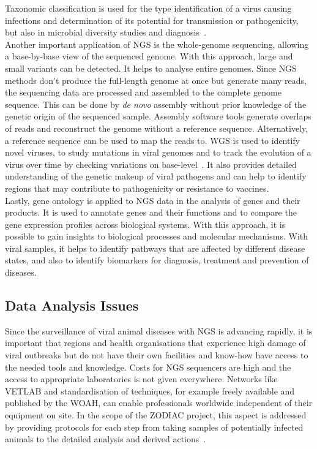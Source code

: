 Taxonomic classification is used for the type identification of a virus causing infections and determination of its potential for transmission or pathogenicity, but also in microbial diversity studies and diagnosis~\cite{dutilh2021perspective}. \\
Another important application of \ac{NGS} is the whole-genome sequencing, allowing a base-by-base view of the sequenced genome. With this approach, large and small variants can be detected. It helps to analyse entire genomes. Since \ac{NGS} methods don't produce the full-length genome at once but generate many reads, the sequencing data are processed and assembled to the complete genome sequence. This can be done by \textit{de novo} assembly without prior knowledge of the genetic origin of the sequenced sample. Assembly software tools generate overlaps of reads and reconstruct the genome without a reference sequence. Alternatively, a reference sequence can be used to map the reads to. \ac{WGS} is used to identify novel viruses, to study mutations in viral genomes and to track the evolution of a virus over time by checking variations on base-level~\cite{slatko2018overview}. It also provides detailed understanding of the genetic makeup of viral pathogens and can help to identify regions that may contribute to pathogenicity or resistance to vaccines. \\
Lastly, gene ontology is applied to \ac{NGS} data in the analysis of genes and their products. It is used to annotate genes and their functions and to compare the gene expression profiles across biological systems. With this approach, it is possible to gain insights to biological processes and molecular mechanisms. With viral samples, it helps to identify pathways that are affected by different disease states, and also to identify biomarkers for diagnosis, treatment and prevention of diseases.

\subsection{Data Analysis Issues}
Since the surveillance of viral animal diseases with \ac{NGS} is advancing rapidly, it is important that regions and health organisations that experience high damage of viral outbreaks but do not have their own facilities and know-how have access to the needed tools and knowledge. Costs for \ac{NGS} sequencers are high and the access to appropriate laboratories is not given everywhere. Networks like \ac{VETLAB} and standardisation of techniques, for example freely available and published by the \ac{WOAH}, can enable professionals worldwide independent of their equipment on site. In the scope of the \ac{ZODIAC} project, this aspect is addressed by providing protocols for each step from taking samples of potentially infected animals to the detailed analysis and derived actions~\cite{zodiac2021}.

